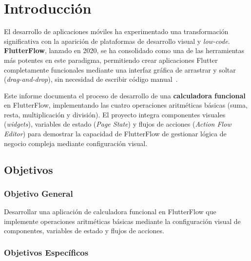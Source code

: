 \documentclass[12pt,a4paper]{article}
\begin{document}

\newpage
{}
\setcounter{page}{1}

\section{Introducción}

El desarrollo de aplicaciones móviles ha experimentado una transformación significativa con la aparición de plataformas de desarrollo visual y \textit{low-code}. \textbf{FlutterFlow}, lanzado en 2020, se ha consolidado como una de las herramientas más potentes en este paradigma, permitiendo crear aplicaciones Flutter completamente funcionales mediante una interfaz gráfica de arrastrar y soltar (\textit{drag-and-drop}), sin necesidad de escribir código manual~\cite{flutterflow2024}.

Este informe documenta el proceso de desarrollo de una \textbf{calculadora funcional} en FlutterFlow, implementando las cuatro operaciones aritméticas básicas (suma, resta, multiplicación y división). El proyecto integra componentes visuales (\textit{widgets}), variables de estado (\textit{Page State}) y flujos de acciones (\textit{Action Flow Editor}) para demostrar la capacidad de FlutterFlow de gestionar lógica de negocio compleja mediante configuración visual.

\subsection{Objetivos}

\subsubsection{Objetivo General}

Desarrollar una aplicación de calculadora funcional en FlutterFlow que implemente operaciones aritméticas básicas mediante la configuración visual de componentes, variables de estado y flujos de acciones.

\subsubsection{Objetivos Específicos}
\end{document}

